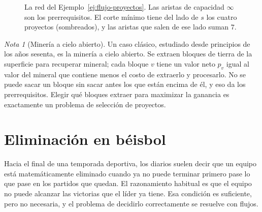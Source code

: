 \documentclass[12pt, spanish, oneside, openany]{book}
\theoremstyle{uprightplain}
\theoremstyle{definition}
\theoremstyle{remark}
\newtheorem{nota}[teorema]{Nota}
\theoremstyle{definition}
\begin{document}
\begin{figure}[H]
\centering
{}
\caption{La red del Ejemplo~\ref{ej:flujo-proyectos}. Las aristas de capacidad
$\infty$ son los prerrequisitos. El corte mínimo tiene del lado de $s$ los cuatro
proyectos (sombreados), y las aristas que salen de ese lado suman $7$.}
\label{fig:flujo-proyectos}
\end{figure}

\begin{nota}[Minería a cielo abierto]
\label{nota:flujo-mineria}
Un caso clásico, estudiado desde principios de los años sesenta, es la minería a cielo abierto. Se extraen bloques de tierra de la superficie para recuperar mineral; cada bloque $v$ tiene un valor neto $p_v$ igual al valor del mineral que contiene menos el costo de extraerlo y procesarlo. No se puede sacar un bloque sin sacar antes los que están encima de él, y eso da los prerrequisitos. Elegir qué bloques extraer para maximizar la ganancia es exactamente un problema de selección de proyectos.
\end{nota}


\section{Eliminación en béisbol}
\label{sec:flujo-beisbol}

Hacia el final de una temporada deportiva, los diarios suelen decir que un equipo está matemáticamente eliminado cuando ya no puede terminar primero pase lo que pase en los partidos que quedan. El razonamiento habitual es que el equipo no puede alcanzar las victorias que el líder ya tiene. Esa condición es suficiente, pero no necesaria, y el problema de decidirlo correctamente se resuelve con flujos.
\end{document}
